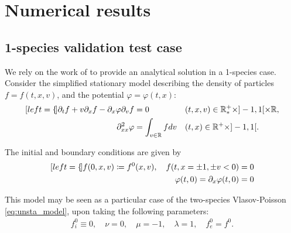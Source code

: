 \documentclass{article}
\numberwithin{equation}{section}
\newcommand{\R}{\mathbb{R}}
\newcommand{\todo}[1]{{\color{red}\textbf{#1}}}
\newcommand{\mysubeq}[2]{ %
	\begin{subequations}\label{#1}
		\begin{align}[left = {\empheqlbrace}]
			#2
		\end{align}
	\end{subequations}	
}
\begin{document}
%
%

\section{Numerical results}
\subsection{1-species validation test case}

We rely on the work of \cite{malkovNonstationaryAntonovSelfgravitating2020} to provide an analytical solution in a 1-species case. Consider the simplified stationary model describing the density of particles $f = f(t,x,v)$, and the potential $\varphi=\varphi(t,x)$:
\mysubeq{eq:one_species_model}{
	\partial_t f + v \partial_x f  - \partial_x \varphi \partial_v f &= 0 && (t,x,v) \in \R^+_* \times ]-1,1[ \times \mathbb{R}, \label{sta_1sp_f} \\
	\partial^2_{xx} \varphi &= \int_{v\in\mathbb{R}} f dv && (t,x) \in \R^+ \times ]-1,1[. \label{sta_phi}
}
The initial and boundary conditions are given by 
\mysubeq{eq:one_species_model_bc}{
	f(0,x,v) \coloneqq f^0(x,v), \quad f(t,x=\pm1, \pm v < 0) &= 0 \\
	\varphi(t,0) = \partial_x \varphi (t,0) &= 0 
}

This model may be seen as a particular case of the two-species Vlasov-Poisson \cref{eq:unsta_model}, upon taking the following parameters:
\begin{align*}
	f_i^0 \equiv 0, \quad \nu = 0, \quad \mu = -1, \quad \lambda = 1, \quad f_e^0 = f^0.
\end{align*}
\end{document}
